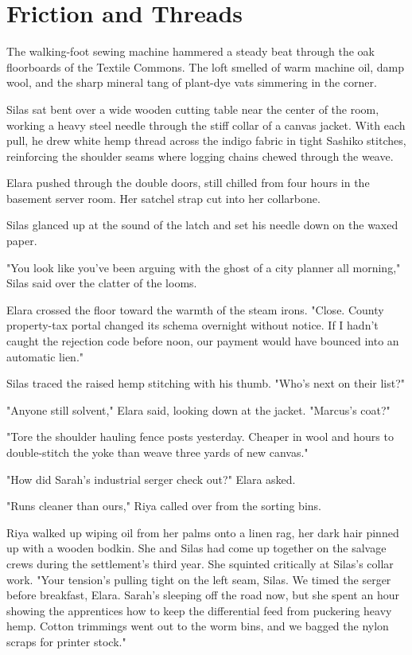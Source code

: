 \chapter{Friction and Threads}












The walking-foot sewing machine hammered a steady beat through the oak floorboards of the Textile Commons. The loft smelled of warm machine oil, damp wool, and the sharp mineral tang of plant-dye vats simmering in the corner.

Silas sat bent over a wide wooden cutting table near the center of the room, working a heavy steel needle through the stiff collar of a canvas jacket. With each pull, he drew white hemp thread across the indigo fabric in tight Sashiko stitches, reinforcing the shoulder seams where logging chains chewed through the weave.

Elara pushed through the double doors, still chilled from four hours in the basement server room. Her satchel strap cut into her collarbone.

Silas glanced up at the sound of the latch and set his needle down on the waxed paper.

"You look like you've been arguing with the ghost of a city planner all morning," Silas said over the clatter of the looms.

Elara crossed the floor toward the warmth of the steam irons. "Close. County property-tax portal changed its schema overnight without notice. If I hadn't caught the rejection code before noon, our payment would have bounced into an automatic lien."

Silas traced the raised hemp stitching with his thumb. "Who's next on their list?"

"Anyone still solvent," Elara said, looking down at the jacket. "Marcus's coat?"

"Tore the shoulder hauling fence posts yesterday. Cheaper in wool and hours to double-stitch the yoke than weave three yards of new canvas."

"How did Sarah's industrial serger check out?" Elara asked.

"Runs cleaner than ours," Riya called over from the sorting bins.

Riya walked up wiping oil from her palms onto a linen rag, her dark hair pinned up with a wooden bodkin. She and Silas had come up together on the salvage crews during the settlement's third year. She squinted critically at Silas's collar work. "Your tension's pulling tight on the left seam, Silas. We timed the serger before breakfast, Elara. Sarah's sleeping off the road now, but she spent an hour showing the apprentices how to keep the differential feed from puckering heavy hemp. Cotton trimmings went out to the worm bins, and we bagged the nylon scraps for printer stock."

